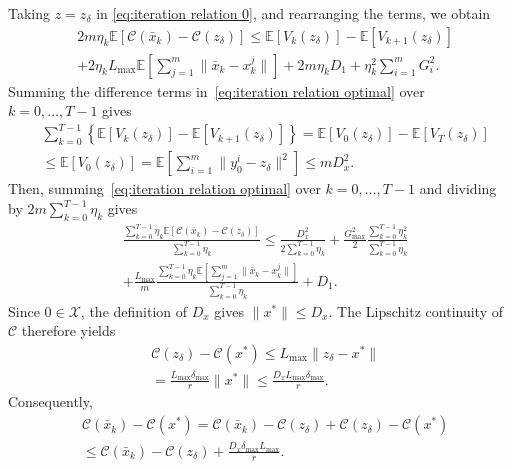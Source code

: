 \documentclass[twocolumn]{autart}    %
\newcommand{\brk}[1]{\left[#1\right]}
\newcommand{\crk}[1]{\left\{#1\right\}}
\newcommand{\1}{\mathbf{1}}
\begin{document}
Taking $z=z_\delta$ in \eqref{eq:iteration relation 0}, and rearranging the terms, we obtain 
\begin{align}\label{eq:iteration relation optimal}
&2m\eta_k\mathbb{E}\brk{\mathcal{C}(\bar{x}_k)-\mathcal{C}(z_\delta)  }  \le   \mathbb{E}\brk{V_k(z_\delta)}   - \mathbb{E}\brk{V_{k+1}(z_\delta)}  \nonumber \\ 
&+2\eta_kL_{\max}   \mathbb{E}\brk{\sum_{j=1}^{m}\|\bar{x}_k-x_k^j\| }+  2m\eta_k D_1  
+\eta_k^{2}  \sum_{i=1}^m G_i^2  .
\end{align}
Summing the difference terms in~\eqref{eq:iteration relation optimal} over $k=0,\ldots,T-1$ gives
\begin{align*}
&\sum_{k=0}^{T-1} \crk{\mathbb{E}\brk{V_{k}(z_\delta)}   - \mathbb{E}\brk{V_{k+1}(z_\delta)}}  =\mathbb{E}\brk{V_{0}(z_\delta)}   - \mathbb{E}\brk{V_{T}(z_\delta)}  \nonumber\\
&\le \mathbb{E}\brk{V_{0}(z_\delta)} =  \mathbb{E}\brk{\sum_{i=1}^m  \|y_0^i-z_\delta\|^2}   \le  m D_x^2. 
\end{align*}
Then, summing~\eqref{eq:iteration relation optimal} over $k=0,\ldots,T-1$ and dividing by $2m\sum_{k=0}^{T-1}\eta_k$ gives
\begin{align}\label{eq:sum eta c regret}
& \!  \frac{\sum_{k=0}^{T-1} \eta_k\mathbb{E}\brk{\mathcal{C}(\bar{x}_k)-\mathcal{C}(z_\delta) }}{\sum_{k=0}^{T-1}\eta_k} \! \le   \!  \frac{D_x^2 }{2\sum_{k=0}^{T-1}\eta_{k}} \!+   \!\frac{G_{\max}^2}{2} \! \frac{\sum_{k=0}^{T-1}\eta_k^2}{\sum_{k=0}^{T-1}\eta_{k}} \nonumber \\ 
&+ 
\frac{ L_{\max}}{m}\frac{\sum_{k=0}^{T-1}  \eta_k  \mathbb{E}\brk{\sum_{j=1}^{m}\|\bar{x}_k-x_k^j\|}}{\sum_{k=0}^{T-1}\eta_{k}} + 
 D_1    .
\end{align}  
Since $0\in\mathcal X$, the definition of $D_x$ gives $\|x^\ast\|\leq D_x$. The Lipschitz continuity of $\mathcal C$ therefore yields
\begin{align}\label{eq:scaled-comparator-gap}
&\mathcal C(z_\delta)-\mathcal C(x^\ast)
\leq L_{\max}\|z_\delta-x^\ast\| \nonumber\\
&=\frac{L_{\max}\delta_{\max}}{r}\|x^\ast\|
\leq\frac{D_xL_{\max}\delta_{\max}}{r}.
\end{align}
Consequently,
\begin{align}\label{eq:scaled-comparator-decomposition}
&\mathcal{C}(\bar{x}_k) - \mathcal{C}(x^\ast)
=\mathcal{C}(\bar{x}_k)-\mathcal C(z_\delta)
+\mathcal C(z_\delta)-\mathcal C(x^\ast)\nonumber\\
&\leq\mathcal{C}(\bar{x}_k)-\mathcal C(z_\delta)
+\frac{D_x\delta_{\max}L_{\max}}{r}.
\end{align}
\end{document}
